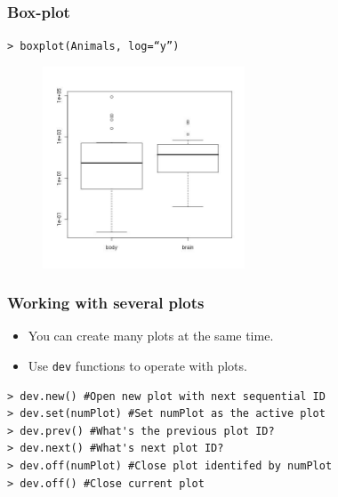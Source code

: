 \documentclass{beamer}
\begin{document}

\begin{frame}

\frametitle{Box-plot}
   \texttt{> boxplot(Animals, log=``y'')}
\begin{center}
\begin{figure}
\includegraphics[height=6.0cm]{figs/boxplot.jpg}
\end{figure}
\end{center}

\end{frame}


\begin{frame}[fragile]

 \frametitle{Working with several plots}
 \begin{itemize}
  \item You can create many plots at the same time.
  \item Use \texttt{dev} functions to operate with plots.
 \end{itemize}
 \begin{verbatim}
> dev.new() #Open new plot with next sequential ID
> dev.set(numPlot) #Set numPlot as the active plot
> dev.prev() #What's the previous plot ID?
> dev.next() #What's next plot ID?
> dev.off(numPlot) #Close plot identifed by numPlot
> dev.off() #Close current plot
 \end{verbatim}

\end{frame}

\end{document}
